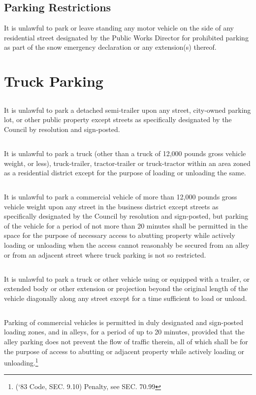 \subsection{Parking Restrictions}
It is unlawful to park or leave standing any motor vehicle on the side of any residential street designated by the Public Works Director for prohibited parking as part of the snow emergency declaration or any extension(s) thereof.

\section{Truck Parking}
\subsection{}
It is unlawful to park a detached semi-trailer upon any street, city-owned parking lot, or other public property except streets as specifically designated by the Council by resolution and sign-posted.
\subsection{}
It is unlawful to park a truck (other than a truck of 12,000 pounds gross vehicle weight, or less), truck-trailer, tractor-trailer or truck-tractor within an area zoned as a residential district except for the purpose of loading or unloading the same.
\subsection{}
It is unlawful to park a commercial vehicle of more than 12,000 pounds gross vehicle weight upon any street in the business district except streets as specifically designated by the Council by resolution and sign-posted, but parking of the vehicle for a period of not more than 20 minutes shall be permitted in the space for the purpose of necessary access to abutting property while actively loading or unloading when the access cannot reasonably be secured from an alley or from an adjacent street where truck parking is not so restricted.
\subsection{}
It is unlawful to park a truck or other vehicle using or equipped with a trailer, or extended body or other extension or projection beyond the original length of the vehicle diagonally along any street except for a time sufficient to load or unload.
\subsection{}
Parking of commercial vehicles is permitted in duly designated and sign-posted loading zones, and in alleys, for a period of up to 20 minutes, provided that the alley parking does not prevent the flow of traffic therein, all of which shall be for the purpose of access to abutting or adjacent property while actively loading or unloading.\footnote{(‘83 Code, SEC. 9.10)  Penalty, see SEC. 70.99}

